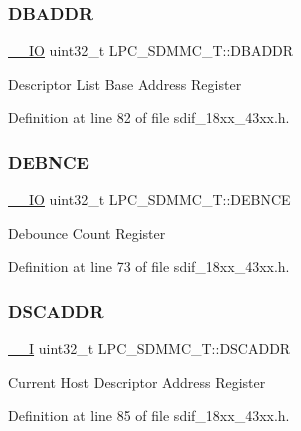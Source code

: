 \subsubsection{\texorpdfstring{D\+B\+A\+D\+DR}{DBADDR}}
{\footnotesize\ttfamily \hyperlink{core__sc300_8h_aec43007d9998a0a0e01faede4133d6be}{\+\_\+\+\_\+\+IO} uint32\+\_\+t L\+P\+C\+\_\+\+S\+D\+M\+M\+C\+\_\+\+T\+::\+D\+B\+A\+D\+DR}

Descriptor List Base Address Register 

Definition at line 82 of file sdif\+\_\+18xx\+\_\+43xx.\+h.

\mbox{\label{struct_l_p_c___s_d_m_m_c___t_a7abb45941fcf29af71b0bd3f290e2ffe}} 
\subsubsection{\texorpdfstring{D\+E\+B\+N\+CE}{DEBNCE}}
{\footnotesize\ttfamily \hyperlink{core__sc300_8h_aec43007d9998a0a0e01faede4133d6be}{\+\_\+\+\_\+\+IO} uint32\+\_\+t L\+P\+C\+\_\+\+S\+D\+M\+M\+C\+\_\+\+T\+::\+D\+E\+B\+N\+CE}

Debounce Count Register 

Definition at line 73 of file sdif\+\_\+18xx\+\_\+43xx.\+h.

\mbox{\label{struct_l_p_c___s_d_m_m_c___t_a7d53c194e4929800bd724142ba2aa949}} 
\subsubsection{\texorpdfstring{D\+S\+C\+A\+D\+DR}{DSCADDR}}
{\footnotesize\ttfamily \hyperlink{core__sc300_8h_af63697ed9952cc71e1225efe205f6cd3}{\+\_\+\+\_\+I} uint32\+\_\+t L\+P\+C\+\_\+\+S\+D\+M\+M\+C\+\_\+\+T\+::\+D\+S\+C\+A\+D\+DR}

Current Host Descriptor Address Register 

Definition at line 85 of file sdif\+\_\+18xx\+\_\+43xx.\+h.

